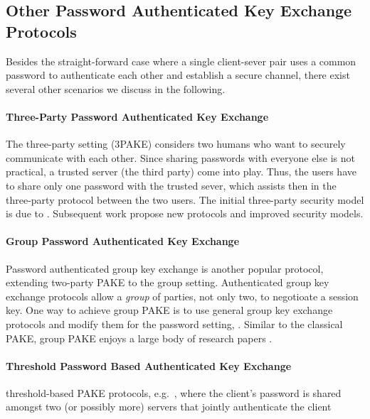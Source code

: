 
\subsection{Other Password Authenticated Key Exchange Protocols}
Besides the straight-forward case where a single client-sever pair uses a common password to authenticate each other and establish a secure channel, there exist several other scenarios we discuss in the following.

\paragraph{Three-Party Password Authenticated Key Exchange}
The three-party setting (3\ac{PAKE}) considers two humans who want to securely communicate with each other.
Since sharing passwords with everyone else is not practical, a trusted server (the third party) come into play.
Thus, the users have to share only one password with the trusted sever, which assists then in the three-party protocol between the two users.
The initial three-party security model is due to \citeauthor{Abdalla2005} \cite{Abdalla2005}.
Subsequent work \cite{CliffTB06,Yoneyama08,TsaiC13} propose new protocols and improved security models.

\paragraph{Group Password Authenticated Key Exchange}
Password authenticated group key exchange is another popular protocol, extending two-party \ac{PAKE} to the group setting.
Authenticated group key exchange protocols allow a \emph{group} of parties, not only two, to negotioate a session key.
One way to achieve group \ac{PAKE} is to use general group key exchange protocols and modify them for the password setting, \eg \cite{Bresson02,BrChPo05}.
Similar to the classical \ac{PAKE}, group \ac{PAKE} enjoys a large body of research papers \cite{Kim2004,Abdalla2006,Bohli2006,Dutta2006,AbdallaP06,AbdallaBVS07,AbdallaCCP09,AbdallaCGP11}.

\paragraph{Threshold Password Based Authenticated Key Exchange}
threshold-based PAKE protocols, e.g.~\cite{Abdalla2005b}, where the client's password is shared amongst two (or possibly more) servers that jointly authenticate the client

